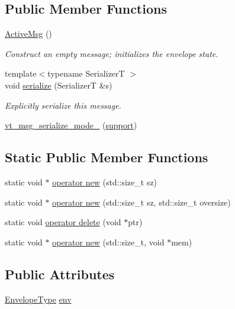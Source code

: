 \subsection*{Public Member Functions}
\begin{DoxyCompactItemize}
\item 
\hyperlink{structvt_1_1messaging_1_1_active_msg_a5fd6a7b78c86b8f1e36198142990a4c4}{Active\+Msg} ()
\begin{DoxyCompactList}\small\item\em Construct an empty message; initializes the envelope state. \end{DoxyCompactList}\item 
{\footnotesize template$<$typename SerializerT $>$ }\\void \hyperlink{structvt_1_1messaging_1_1_active_msg_a758f02bef5991c48d6c9a56c30ca7ad9}{serialize} (SerializerT \&s)
\begin{DoxyCompactList}\small\item\em Explicitly serialize this message. \end{DoxyCompactList}\item 
\hyperlink{structvt_1_1messaging_1_1_active_msg_a97b214f27e477ea5951a2d697f2256e7}{vt\+\_\+msg\+\_\+serialize\+\_\+mode\+\_\+} (\hyperlink{namespacevt_1_1messaging_a436c5b9fc7f591e5978a136999cb9ef8a434990c8a25d2be94863561ae98bd682}{support})
\end{DoxyCompactItemize}
\subsection*{Static Public Member Functions}
\begin{DoxyCompactItemize}
\item 
static void $\ast$ \hyperlink{structvt_1_1messaging_1_1_active_msg_ac79d16742251f19ed94f9725ed866f64}{operator new} (std\+::size\+\_\+t sz)
\item 
static void $\ast$ \hyperlink{structvt_1_1messaging_1_1_active_msg_ac13140f75e5238670c81589a84881ac1}{operator new} (std\+::size\+\_\+t sz, std\+::size\+\_\+t oversize)
\item 
static void \hyperlink{structvt_1_1messaging_1_1_active_msg_a37cd0731f99157266333772f501d390d}{operator delete} (void $\ast$ptr)
\item 
static void $\ast$ \hyperlink{structvt_1_1messaging_1_1_active_msg_a03927a2881ef7e3308765361cb89c606}{operator new} (std\+::size\+\_\+t, void $\ast$mem)
\end{DoxyCompactItemize}
\subsection*{Public Attributes}
\begin{DoxyCompactItemize}
\item 
\hyperlink{structvt_1_1messaging_1_1_active_msg_a6e2b0541c25f7290555bf50d7cc05874}{Envelope\+Type} \hyperlink{structvt_1_1messaging_1_1_active_msg_ae3f8937b2c95f548f1a3c3340b887c09}{env}
\end{DoxyCompactItemize}


